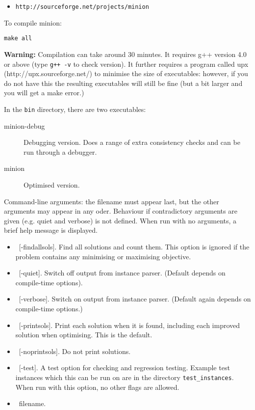 \documentclass{article}
\begin{document}
\begin{small}
\begin{itemize}
\item \texttt{http://sourceforge.net/projects/minion}
\end{itemize}

To compile {\sc minion}:

\begin{verbatim}
make all
\end{verbatim}
{\bf Warning:} Compilation can take around 30 minutes. It requires g++
version 4.0 or above (type \texttt{g++ -v} to
check version).   It further requires a program called upx 
(http://upx.sourceforge.net/) to minimise the size of executables: however, if you 
do not have this the resulting executables will still be fine (but a bit larger and you
will get a make error.)

In the {\tt bin} directory, there are two executables:

\begin{description}
\item[minion-debug] Debugging version. Does a range of extra consistency
checks and can be run through a debugger.
\item[minion] Optimised version.
\end{description}

Command-line arguments: the filename must appear last, but the other arguments may appear in any oder.   Behaviour if contradictory arguments are given (e.g. quiet and verbose) is not defined.
When run with no arguments, a brief help message is displayed.

\begin{itemize}
\item\ [-findallsols].   Find all solutions and count them.   This option is ignored if the problem contains any minimising or maximising objective.
\item\ [-quiet]. Switch off output from instance parser.  (Default depends on compile-time options).
\item\ [-verbose]. Switch on output from instance parser.  (Default again depends on compile-time options.)
\item\ [-printsols].   Print each solution when it is found, including each improved solution when optimising.  This is the default.
\item\ [-noprintsols].   Do not print solutions.
\item\ [-test].  A test option for checking and regression testing.   Example test instances which this can be run on are in the directory {\tt test\_instances}.   When run with this option, 
no other flags are allowed.   
\item\ filename.
\end{itemize}


\end{small}
\end{document}
